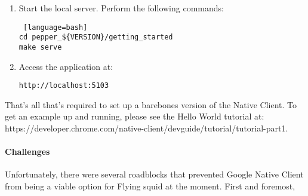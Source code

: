 \begin{appendices}
\begin{enumerate}
\begin{lstlisting} [language=bash] 
naclsdk update
\end{lstlisting}

\item Start the local server. Perform the following commands:

\begin{lstlisting} [language=bash] 
cd pepper_${VERSION}/getting_started
make serve
\end{lstlisting}

\item Access the application at:

\begin{verbatim}
http://localhost:5103
\end{verbatim}

\end{enumerate}

That's all that's required to set up a barebones version of the Native Client. To get an example up and running, please see the Hello World tutorial at: https://developer.chrome.com/native-client/devguide/tutorial/tutorial-part1.

\paragraph{Challenges}

Unfortunately, there were several roadblocks that prevented Google Native Client from being a viable option for Flying squid at the moment. First and foremost, 

\end{appendices}